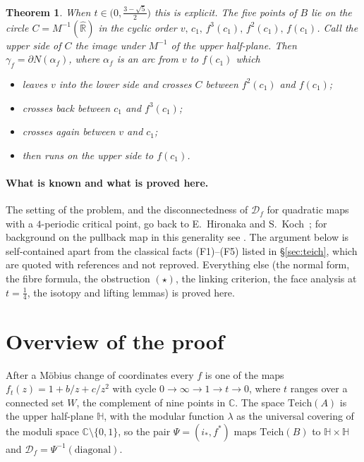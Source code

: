 \documentclass[11pt]{article}
\newtheorem{theorem}{Theorem}
\theoremstyle{definition}
\newcommand{\Teich}{\mathrm{Teich}}
\newcommand{\Rh}{\hat{\mathbb R}}
\newcommand{\HH}{\mathbb H}
\newcommand{\D}{\mathcal D}
\begin{document}
\begin{theorem}
When $t\in\bigl(0,\tfrac{3-\sqrt5}{2}\bigr)$ this is explicit. The five points of $B$ lie on the circle $C=M^{-1}(\Rh)$ in the cyclic order $v,\,c_1,\,f^3(c_1),\,f^2(c_1),\,f(c_1)$. Call the \emph{upper} side of $C$ the image under $M^{-1}$ of the upper half-plane. Then $\gamma_f=\partial N(\alpha_f)$, where $\alpha_f$ is an arc from $v$ to $f(c_1)$ which
\begin{itemize}[nosep]
\item leaves $v$ into the lower side and crosses $C$ between $f^2(c_1)$ and $f(c_1)$;
\item crosses back between $c_1$ and $f^3(c_1)$;
\item crosses again between $v$ and $c_1$;
\item then runs on the upper side to $f(c_1)$.
\end{itemize}
\end{theorem}


\paragraph{What is known and what is proved here.} The setting of the problem, and the disconnectedness of $\D_f$ for quadratic maps with a $4$-periodic critical point, go back to E.~Hironaka and S.~Koch~\cite{HK}; for background on the pullback map in this generality see \cite{DH,BEKP}. The argument below is self-contained apart from the classical facts (F1)--(F5) listed in \S\ref{sec:teich}, which are quoted with references and not reproved. Everything else (the normal form, the fibre formula, the obstruction $(\star)$, the linking criterion, the face analysis at $t=\tfrac14$, the isotopy and lifting lemmas) is proved here.

\section{Overview of the proof}

After a M\"obius change of coordinates every $f$ is one of the maps $f_t(z)=1+b/z+c/z^2$ with cycle $0\to\infty\to1\to t\to0$, where $t$ ranges over a connected set $W$, the complement of nine points in $\mathbb C$. The space $\Teich(A)$ is the upper half-plane $\HH$, with the modular function $\lambda$ as the universal covering of the moduli space $\mathbb C\setminus\{0,1\}$, so the pair $\Psi=(i_*,f^*)$ maps $\Teich(B)$ to $\HH\times\HH$ and $\D_f=\Psi^{-1}(\text{diagonal})$.
\end{document}
